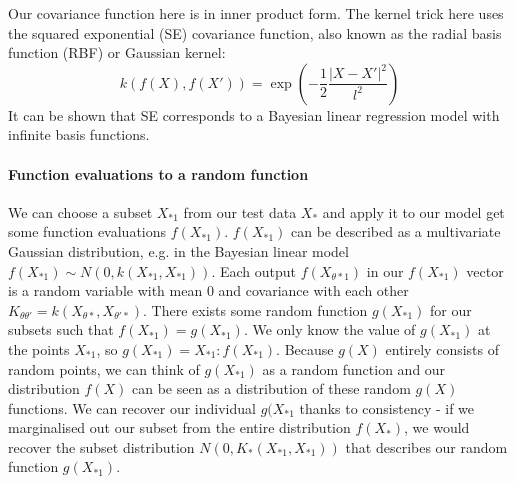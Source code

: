 Our covariance function here is in inner product form. The kernel trick here uses the squared exponential (SE) covariance function, also known as the radial basis function (RBF) or Gaussian kernel:
\begin{equation*}
    k(f(X), f(X')) = \exp\left(-\frac{1}{2}\frac{|X - X'|^2}{l^2}\right)
\end{equation*}
It can be shown that SE corresponds to a Bayesian linear regression model with infinite basis functions. 



\paragraph{Function evaluations to a random function}
We can choose a subset $X_{*1}$ from our test data $X_*$ and apply it to our model get some function evaluations $f(X_{*1})$. $f(X_{*1})$ can be described as a multivariate Gaussian distribution, e.g. in the Bayesian linear model $f(X_{*1}) \sim N(0, k(X_{*1}, X_{*1}))$. Each output $f(X_{\theta*1})$ in our $f(X_{*1})$ vector is a random variable with mean $0$ and covariance with each other $K_{\theta\theta'} = k(X_{\theta*}, X_{\theta'*})$. There exists some random function $g(X_{*1})$ for our subsets such that $f(X_{*1}) = g(X_{*1})$. We only know the value of $g(X_{*1})$ at the points $X_{*1}$, so $g(X_{*1}) = {X_{*1} : f(X_{*1})}$. Because $g(X)$ entirely consists of random points, we can think of $g(X_{*1})$ as a random function and our distribution $f(X)$ can be seen as a distribution of these random $g(X)$ functions. We can recover our individual $g(X_{*1}$ thanks to consistency - if we marginalised out our subset from the entire distribution $f(X_*)$, we would recover the subset distribution $N(0, K_*(X_{*1}, X_{*1}))$ that describes our random function $g(X_{*1})$.

